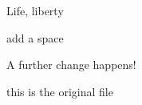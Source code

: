 \documentclass{article}
\begin{document}
Life, liberty
 
 add a space
 
 A further change happens!
 
 this is the original file%
 
\end{document}
